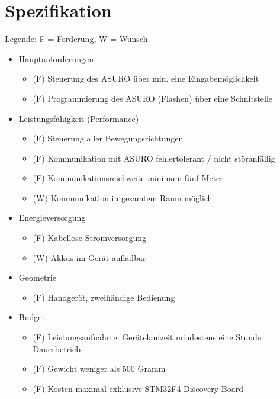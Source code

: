 \section{Spezifikation}
Legende: F = Forderung, W = Wunsch
\begin{itemize}
	\item Hauptanforderungen
	\begin{itemize}
		\item (F) Steuerung des ASURO über min. eine Eingabemöglichkeit
		\item (F) Programmierung des ASURO (Flashen) über eine Schnitstelle	
	\end{itemize}

\item Leistungsfähigkeit (Performance)
	\begin{itemize}
		\item (F) Steuerung aller Bewegungsrichtungen
		\item (F) Kommunikation mit ASURO fehlertolerant / nicht störanfällig
		\item (F) Kommunikationsreichweite minimum fünf Meter
		\item (W) Kommunikation in gesamtem Raum möglich
	\end{itemize}
\item Energieversorgung
	\begin{itemize}
		\item (F) Kabellose Stromversorgung
		\item (W) Akkus im Gerät aufladbar
	\end{itemize}
\item Geometrie
	\begin{itemize}
		\item (F) Handgerät, zweihändige Bedienung
	\end{itemize}
\item Budget
	\begin{itemize}
		\item (F) Leistungsaufnahme: Gerätelaufzeit mindestens eine Stunde Dauerbetrieb
	\end{itemize}
	\begin{itemize}
		\item (F) Gewicht weniger als 500 Gramm
	\end{itemize}
	\begin{itemize}
		\item (F) Kosten maximal  exklusive STM32F4 Discovery Board
	\end{itemize}
	\begin{itemize}

\end{itemize}
\end{itemize}

